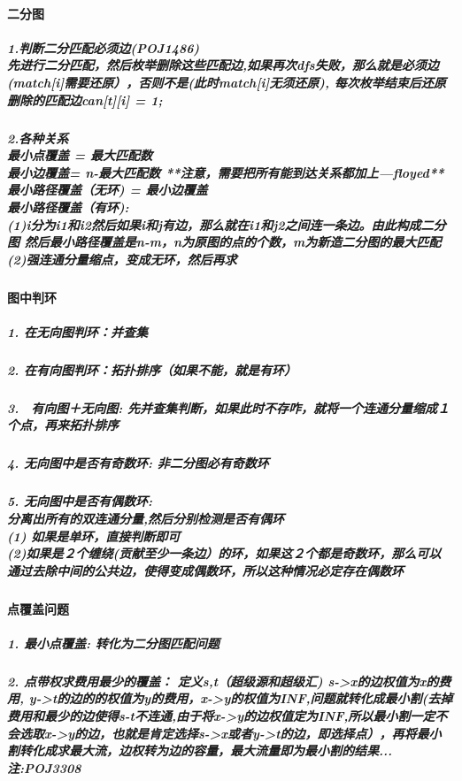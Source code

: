 \documentclass{article}
\begin{document}
\paragraph{二分图}
\subparagraph{1.判断二分匹配必须边(POJ1486)\\
先进行二分匹配，然后枚举删除这些匹配边,如果再次dfs失败，那么就是必须边(match[i]需要还原），否则不是(此时match[i]无须还原), 每次枚举结束后还原删除的匹配边can[t][i] = 1;}

\subparagraph{2.各种关系\\
最小点覆盖 = 最大匹配数\\
最小边覆盖= n-最大匹配数 **注意，需要把所有能到达关系都加上---floyed** \\
最小路径覆盖（无环) = 最小边覆盖  \\
最小路径覆盖（有环): \\
(1)i分为i1和i2然后如果i和j有边，那么就在i1和j2之间连一条边。由此构成二分图 然后最小路径覆盖是n-m，n为原图的点的个数，m为新造二分图的最大匹配 \\ 
(2)强连通分量缩点，变成无环，然后再求
}
\paragraph{图中判环}
\subparagraph{1. 在无向图判环：并查集}
\subparagraph{2. 在有向图判环：拓扑排序（如果不能，就是有环）}
\subparagraph{3.　有向图＋无向图: 先并查集判断，如果此时不存咋，就将一个连通分量缩成１个点，再来拓扑排序}
\subparagraph{4. 无向图中是否有奇数环:  非二分图必有奇数环}
\subparagraph{5. 无向图中是否有偶数环: \\ 分离出所有的双连通分量,然后分别检测是否有偶环 \\
(1) 如果是单环，直接判断即可 \\
(2)如果是２个缠绕(贡献至少一条边）的环，如果这２个都是奇数环，那么可以通过去除中间的公共边，使得变成偶数环，所以这种情况必定存在偶数环}
\paragraph{点覆盖问题}
\subparagraph{1. 最小点覆盖: 转化为二分图匹配问题}
\subparagraph{2. 点带权求费用最少的覆盖： 定义s,t（超级源和超级汇)  s->x的边权值为x的费用, y->t的边的的权值为y的费用，x->y的权值为INF,问题就转化成最小割(去掉费用和最少的边使得s-t不连通,由于将x->y的边权值定为INF,所以最小割一定不会选取x->y的边，也就是肯定选择s->x或者y->t的边，即选择点），再将最小割转化成求最大流，边权转为边的容量，最大流量即为最小割的结果... 注:POJ3308}
\end{document}
